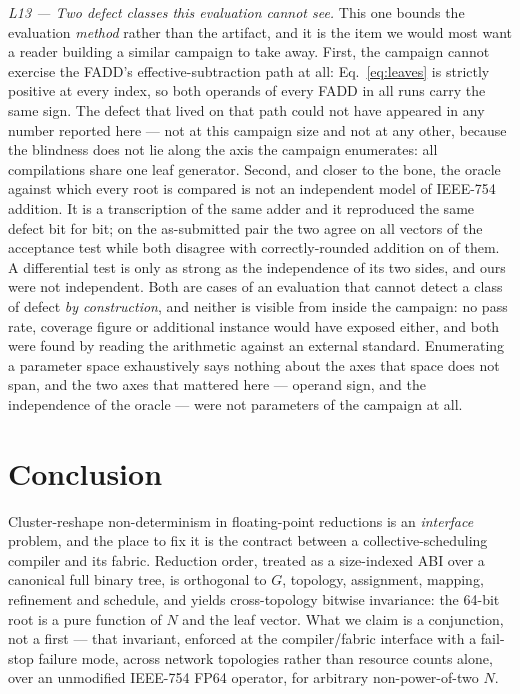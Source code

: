 \documentclass[journal,10pt]{IEEEtran}
\theoremstyle{plain}
\theoremstyle{definition}
\theoremstyle{remark}
\begin{document}
\emph{L13 --- Two defect classes this evaluation cannot see.} This one bounds
the evaluation \emph{method} rather than the artifact, and it is the item we
would most want a reader building a similar campaign to take away. First, the
campaign cannot exercise the FADD's effective-subtraction path at all:
Eq.~\eqref{eq:leaves} is strictly positive at every index, so both operands of
every FADD in all \WallTBs{} runs carry the same sign. The defect that lived
on that path could not have appeared in any number reported here --- not at
this campaign size and not at any other, because the blindness does not lie
along the axis the campaign enumerates: all \CompileTotal{} compilations share
one leaf generator. Second, and closer to the bone, the oracle against which
every root is compared is not an independent model of IEEE-754 addition. It is
a transcription of the same adder and it reproduced the same defect bit for
bit; on the as-submitted pair the two agree on all \FpCtrlVectors{} vectors of
the acceptance test while both disagree with correctly-rounded addition on
\FpCtrlErrors{} of them. A differential test is only as strong as the
independence of its two sides, and ours were not independent. Both are cases
of an evaluation that cannot detect a class of defect \emph{by construction},
and neither is visible from inside the campaign: no pass rate, coverage figure
or additional instance would have exposed either, and both were found by
reading the arithmetic against an external standard. Enumerating a parameter
space exhaustively says nothing about the axes that space does not span, and
the two axes that mattered here --- operand sign, and the independence of the
oracle --- were not parameters of the campaign at all.


\section{Conclusion}\label{sec:conclusion}

Cluster-reshape non-determinism in floating-point reductions is an
\emph{interface} problem, and the place to fix it is the contract between a
collective-scheduling compiler and its fabric. Reduction order, treated as a
size-indexed ABI over a canonical full binary tree, is orthogonal to $G$,
topology, assignment, mapping, refinement and schedule, and yields
cross-topology bitwise invariance: the 64-bit root is a pure function of $N$
and the leaf vector. What we claim is a conjunction, not a first --- that
invariant, enforced at the compiler/fabric interface with a fail-stop failure
mode, across network topologies rather than resource counts alone, over an
unmodified IEEE-754 FP64 operator, for arbitrary non-power-of-two $N$.
\end{document}
